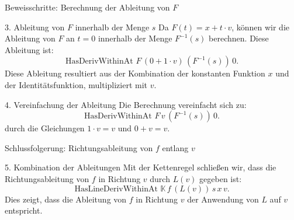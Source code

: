 \documentclass{beamer}
\begin{document}
    \begin{frame}{Beweisschritte: Berechnung der Ableitung von \( F \)}
        \begin{block}{3. Ableitung von \( F \) innerhalb der Menge \( s \)}
            Da \( F(t) = x + t \cdot v \), können wir die Ableitung von \( F \) an \( t = 0 \) innerhalb der Menge \( F^{-1}(s) \) berechnen. Diese Ableitung ist:
            \[
            \text{HasDerivWithinAt } F \, (0 + 1 \cdot v) \, (F^{-1}(s)) \, 0.
            \]
            Diese Ableitung resultiert aus der Kombination der konstanten Funktion \( x \) und der Identitätsfunktion, multipliziert mit \( v \).
        \end{block}
    
        \begin{block}{4. Vereinfachung der Ableitung}
            Die Berechnung vereinfacht sich zu:
            \[
            \text{HasDerivWithinAt } F \, v \, (F^{-1}(s)) \, 0.
            \]
            durch die Gleichungen \( 1 \cdot v = v \) und \( 0 + v = v \).
        \end{block}
    \end{frame}
    
    \begin{frame}{Schlussfolgerung: Richtungsableitung von \( f \) entlang \( v \)}
        \begin{block}{5. Kombination der Ableitungen}
            Mit der Kettenregel schließen wir, dass die Richtungsableitung von \( f \) in Richtung \( v \) durch \( L(v) \) gegeben ist:
            \[
            \text{HasLineDerivWithinAt } \mathbb{K} \, f \, (L(v)) \, s \, x \, v.
            \]
            Dies zeigt, dass die Ableitung von \( f \) in Richtung \( v \) der Anwendung von \( L \) auf \( v \) entspricht.
        \end{block}
    \end{frame}
\end{document}
